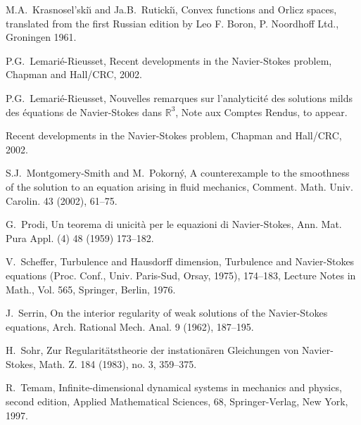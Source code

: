 \documentclass[12pt]{amsart}
\theoremstyle{remark}
\begin{document}
\begin{thebibliography}{999}
M.A.~Krasnosel'ski{\u\i} and Ja.B.~Ruticki\u\i,
Convex functions and Orlicz spaces,
translated from the first Russian edition by Leo F. Boron, 
P. Noordhoff Ltd., 
Groningen 1961.

P.G.~Lemari\'e-Rieusset,
Recent developments in the Navier-Stokes problem,
Chapman and Hall/CRC, 2002.

P.G.~Lemari\'e-Rieusset,
Nouvelles remarques sur l'analyticit\'e des solutions milds des
\'equations de Navier-Stokes dans $\mathbb R^3$,
Note aux Comptes Rendus, to appear.

Recent developments in the Navier-Stokes problem,
Chapman and Hall/CRC, 2002.

S.J.~Montgomery-Smith and M.~Pokorn\'y,
A counterexample to the smoothness of the solution to an 
equation arising in fluid mechanics,
Comment. Math. Univ. Carolin.  43  (2002),  61--75.

G.~Prodi,
Un teorema di unicit\`a per le equazioni di Navier-Stokes,
Ann. Mat. Pura Appl. (4)  48  (1959) 173--182.

V.~Scheffer,
Turbulence and Hausdorff dimension, 
Turbulence and Navier-Stokes equations
(Proc. Conf., Univ. Paris-Sud, Orsay, 1975), 174--183,
Lecture Notes in Math., Vol. 565, Springer, Berlin, 1976. 

J.~Serrin,
On the interior regularity of weak solutions of the Navier-Stokes equations,
Arch. Rational Mech. Anal.  9  (1962), 187--195.

H.~Sohr,
Zur Regularit\"atstheorie der instation\"aren Gleichungen von Navier-Stokes, 
Math. Z.  184  (1983),  no. 3, 359--375.

R.~Temam,
Infinite-dimensional dynamical systems in mechanics and physics,
second edition, Applied Mathematical Sciences, 68,
Springer-Verlag, New York, 1997.

\end{thebibliography}
\end{document}

